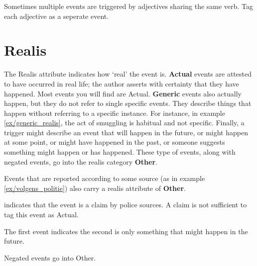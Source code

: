 Sometimes multiple events are triggered by adjectives sharing the same verb. Tag each adjective as a seperate event.

\section{Realis}

The Realis attribute indicates how `real' the event is. \textbf{Actual} events are attested to have occurred in real life; the author asserts with certainty that they have happened. Most events you will find are Actual. \textbf{Generic} events also actually happen, but they do not refer to single specific events. They describe things that happen without referring to a specific instance. For instance, in example \ref{ex/generic_realis}, the act of smuggling is habitual and not specific. Finally, a trigger might describe an event that will happen in the future, or might happen at some point, or might have happened in the past, or someone suggests something might happen or has happened. These type of events, along with negated events, go into the realis category \textbf{Other}.

Events that are reported according to some source (as in example \ref{ex/volgens_politie}) also carry a realis attribute of \textbf{Other}.

\begin{exe}
    \ex {}
        \expl {}
    
    \ex\label{ex/generic_realis} 
        \expl {}

    \ex\label{ex/volgens_politie} 
        \expl {}  indicates that the event is a claim by police sources. A claim is not sufficient to tag this event as Actual.
    
    \ex {}
        \expl {}  
        \expl {}  The first event indicates the second is only something that might happen in the future.
    
    \ex {}
        \expl {} Negated events go into Other.
\end{exe}


